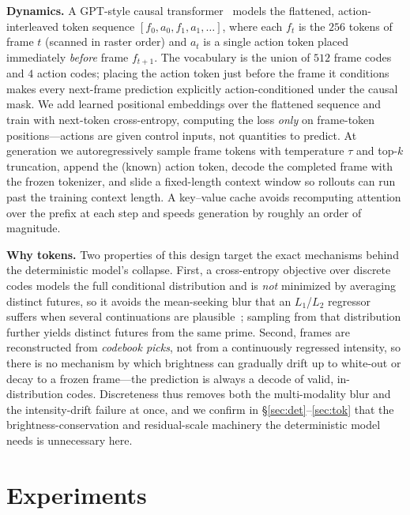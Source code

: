 \documentclass[10pt,twocolumn,letterpaper]{article}
\begin{document}
\textbf{Dynamics.} A GPT-style causal transformer~\cite{vaswani2017attention,
chen2020igpt} models the flattened, action-interleaved token sequence
$[f_0,a_0,f_1,a_1,\dots]$, where each $f_t$ is the $256$ tokens of frame $t$
(scanned in raster order) and $a_t$ is a single action token placed immediately
\emph{before} frame $f_{t+1}$. The vocabulary is the union of $512$ frame codes
and $4$ action codes; placing the action token just before the frame it
conditions makes every next-frame prediction explicitly action-conditioned under
the causal mask. We add learned positional embeddings over the flattened
sequence and train with next-token cross-entropy, computing the loss \emph{only}
on frame-token positions---actions are given control inputs, not quantities to
predict. At generation we autoregressively sample frame tokens with temperature
$\tau$ and top-$k$ truncation, append the (known) action token, decode the
completed frame with the frozen tokenizer, and slide a fixed-length context
window so rollouts can run past the training context length. A key--value cache
avoids recomputing attention over the prefix at each step and speeds generation
by roughly an order of magnitude.

\textbf{Why tokens.} Two properties of this design target the exact mechanisms
behind the deterministic model's collapse. First, a cross-entropy objective over
discrete codes models the full conditional distribution and is \emph{not}
minimized by averaging distinct futures, so it avoids the mean-seeking blur that
an $L_1$/$L_2$ regressor suffers when several continuations are
plausible~\cite{mathieu2016deep}; sampling from that distribution further yields
distinct futures from the same prime. Second, frames are reconstructed
from \emph{codebook picks}, not from a continuously regressed intensity, so there
is no mechanism by which brightness can gradually drift up to white-out or decay
to a frozen frame---the prediction is always a decode of valid, in-distribution
codes. Discreteness thus removes both the multi-modality blur and the
intensity-drift failure at once, and we confirm in \S\ref{sec:det}--\ref{sec:tok} that the
brightness-conservation and residual-scale machinery the deterministic model
needs is unnecessary here.

\section{Experiments}
\end{document}
